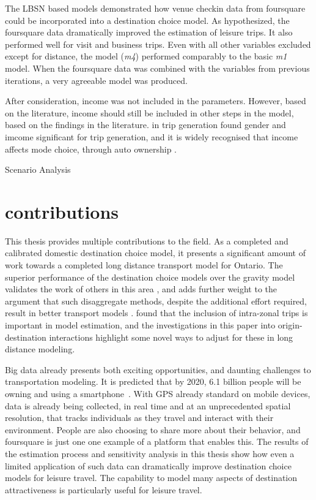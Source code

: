 The LBSN based models demonstrated how venue checkin data from foursquare could be incorporated into a destination choice model. As hypothesized, the foursquare data dramatically improved the estimation of leisure trips. It also performed well for visit and business trips. Even with all other variables excluded except for distance, the model (\textit{m4}) performed comparably to the basic \textit{m1} model. When the foursquare data was combined with the variables from previous iterations, a very agreeable model was produced.

After consideration, income was not included in the parameters. However, based on the literature, income should still be included in other steps in the model, based on the findings in the literature. in trip generation\textcite{limtanakool2006participation} found gender and imcome significant for trip generation, and it is widely recognised that income affects mode choice, through auto ownership \parencite{ben1974some, miller1998urban, raphael2002car}.

Scenario Analysis


\section{contributions}
This thesis provides multiple contributions to the field. As a completed and calibrated domestic destination choice model, it presents a significant amount of work towards a completed long distance transport model for Ontario. The superior performance of the destination choice models over the gravity model validates the work of others in this area \parencite{Mishra13}, 
and adds further weight to the argument that such disaggregate methods, despite the additional effort required, result in better transport models \parencite{sbayti2010best, lemp2007aggregate}. \textcite{bhatta2011intrazonal} found that the inclusion of intra-zonal trips is important in model estimation, and the investigations in this paper into origin-destination interactions highlight some novel ways to adjust for these in long distance modeling.

Big data already presents both exciting opportunities, and daunting challenges to transportation modeling. It is predicted that by 2020, 6.1 billion people will be owning and using a smartphone~\parencite{ericsson16}. With GPS already standard on mobile devices, data is already being collected, in real time and at an unprecedented spatial resolution, that tracks individuals as they travel and interact with their environment. People are also choosing to share more about their behavior, and foursquare is just one one example of a platform that enables this. The results of the estimation process and sensitivity analysis in this thesis show how even a limited application of such data can dramatically improve destination choice models for leisure travel. The capability to model many aspects of destination attractiveness is particularly useful for leisure travel.

